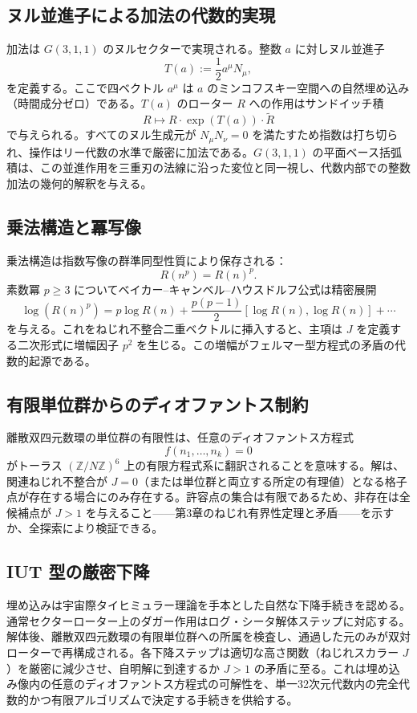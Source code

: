 \documentclass[a4paper]{article}
\theoremstyle{definition}
\begin{document}
\subsection{ヌル並進子による加法の代数的実現}

加法は $G(3,1,1)$ のヌルセクターで実現される。整数 $a$ に対しヌル並進子
\[
T(a) := \frac12 a^\mu N_\mu,
\]
を定義する。ここで四ベクトル $a^\mu$ は $a$ のミンコフスキー空間への自然埋め込み（時間成分ゼロ）である。$T(a)$ のローター $R$ への作用はサンドイッチ積
\[
R \mapsto R \cdot \exp(T(a)) \cdot \widetilde{R}
\]
で与えられる。すべてのヌル生成元が $N_\mu N_\nu = 0$ を満たすため指数は打ち切られ、操作はリー代数の水準で厳密に加法である。$G(3,1,1)$ の平面ベース括弧積は、この並進作用を三重刃の法線に沿った変位と同一視し、代数内部での整数加法の幾何的解釈を与える。

\subsection{乗法構造と冪写像}

乗法構造は指数写像の群準同型性質により保存される：
\[
R(n^p) = R(n)^p.
\]
素数冪 $p \geq 3$ についてベイカー--キャンベル--ハウスドルフ公式は精密展開
\[
\log(R(n)^p) = p \log R(n) + \frac{p(p-1)}{2} [\log R(n), \log R(n)] + \cdots
\]
を与える。これをねじれ不整合二重ベクトルに挿入すると、主項は $J$ を定義する二次形式に増幅因子 $p^2$ を生じる。この増幅がフェルマー型方程式の矛盾の代数的起源である。

\subsection{有限単位群からのディオファントス制約}

離散双四元数環の単位群の有限性は、任意のディオファントス方程式
\[
f(n_1,\dots,n_k) = 0
\]
がトーラス $(\mathbb{Z}/N\mathbb{Z})^6$ 上の有限方程式系に翻訳されることを意味する。解は、関連ねじれ不整合が $J = 0$（または単位群と両立する所定の有理値）となる格子点が存在する場合にのみ存在する。許容点の集合は有限であるため、非存在は全候補点が $J > 1$ を与えること——第3章のねじれ有界性定理と矛盾——を示すか、全探索により検証できる。

\subsection{IUT 型の厳密下降}

埋め込みは宇宙際タイヒミュラー理論を手本とした自然な下降手続きを認める。通常セクターローター上のダガー作用はログ・シータ解体ステップに対応する。解体後、離散双四元数環の有限単位群への所属を検査し、通過した元のみが双対ローターで再構成される。各下降ステップは適切な高さ関数（ねじれスカラー $J$）を厳密に減少させ、自明解に到達するか $J > 1$ の矛盾に至る。これは埋め込み像内の任意のディオファントス方程式の可解性を、単一32次元代数内の完全代数的かつ有限アルゴリズムで決定する手続きを供給する。
\end{document}
